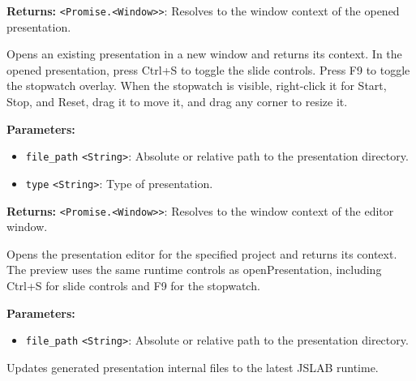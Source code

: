 \documentclass[12pt,a4paper]{article}
\begin{document}
\noindent \textbf{Returns:} \texttt{<Promise.<Window>>}: Resolves to the window context of the opened presentation.

\noindent Opens an existing presentation in a new window and returns its context.
In the opened presentation, press Ctrl+S to toggle the slide controls.
Press F9 to toggle the stopwatch overlay.
When the stopwatch is visible, right-click it for Start, Stop, and Reset,
drag it to move it, and drag any corner to resize it.

\vspace{5mm}
\noindent {}


\noindent \textbf{Parameters:}
\begin{itemize}
  \item \texttt{file\_path} \texttt{<String>}: Absolute or relative path to the presentation directory.
  \item \texttt{type} \texttt{<String>}: Type of presentation.
\end{itemize}

\noindent \textbf{Returns:} \texttt{<Promise.<Window>>}: Resolves to the window context of the editor window.

\noindent Opens the presentation editor for the specified project and returns its context.
The preview uses the same runtime controls as openPresentation,
including Ctrl+S for slide controls and F9 for the stopwatch.

\vspace{5mm}
\noindent {}


\noindent \textbf{Parameters:}
\begin{itemize}
  \item \texttt{file\_path} \texttt{<String>}: Absolute or relative path to the presentation directory.
\end{itemize}

\noindent Updates generated presentation internal files to the latest JSLAB runtime.

\vspace{5mm}
\noindent {}
\end{document}
